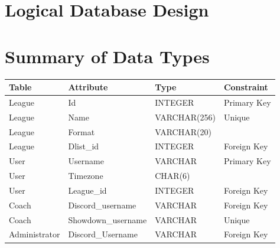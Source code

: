 \documentclass{article}
\begin{document}
\section*{Logical Database Design}
\section*{Summary of Data Types}
\begin{table}[H]
    \large
    \centering
    \begin{tabular}{|l|l|l|l|}
    \hline
    {\color[HTML]{2E3436} \textbf{Table}} & {\color[HTML]{2E3436} \textbf{Attribute}} & {\color[HTML]{2E3436} \textbf{Type}} & {\color[HTML]{2E3436} \textbf{Constraint}} \\ \hline
    {\color[HTML]{2E3436} League} & {\color[HTML]{2E3436} Id} & {\color[HTML]{2E3436} INTEGER} & {\color[HTML]{2E3436} Primary Key} \\ \hline
    {\color[HTML]{2E3436} League} & {\color[HTML]{2E3436} Name} & {\color[HTML]{2E3436} VARCHAR(256)} & {\color[HTML]{2E3436} Unique} \\ \hline
    {\color[HTML]{2E3436} League} & {\color[HTML]{2E3436} Format} & {\color[HTML]{2E3436} VARCHAR(20)} & {\color[HTML]{2E3436} } \\ \hline
    {\color[HTML]{2E3436} League} & {\color[HTML]{2E3436} Dlist\_id} & {\color[HTML]{2E3436} INTEGER} & {\color[HTML]{2E3436} Foreign Key} \\ \hline
    {\color[HTML]{2E3436} User} & {\color[HTML]{2E3436} Username} & {\color[HTML]{2E3436} VARCHAR} & {\color[HTML]{2E3436} Primary Key} \\ \hline
    {\color[HTML]{2E3436} User} & {\color[HTML]{2E3436} Timezone} & {\color[HTML]{2E3436} CHAR(6)} & {\color[HTML]{2E3436} } \\ \hline
    {\color[HTML]{2E3436} User} & {\color[HTML]{2E3436} League\_id} & {\color[HTML]{2E3436} INTEGER} & {\color[HTML]{2E3436} Foreign Key} \\ \hline
    {\color[HTML]{2E3436} Coach} & {\color[HTML]{2E3436} Discord\_username} & {\color[HTML]{2E3436} VARCHAR} & {\color[HTML]{2E3436} Foreign Key} \\ \hline
    {\color[HTML]{2E3436} Coach} & {\color[HTML]{2E3436} Showdown\_username} & {\color[HTML]{2E3436} VARCHAR} & {\color[HTML]{2E3436} Unique} \\ \hline
    {\color[HTML]{2E3436} Administrator} & {\color[HTML]{2E3436} Discord\_Username} & {\color[HTML]{2E3436} VARCHAR} & {\color[HTML]{2E3436} Foreign Key} \\ \hline

\end{tabular}
\end{table}
\end{document}
